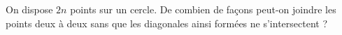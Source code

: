 On dispose $2n$ points sur un cercle. De combien de façons peut-on joindre les points deux à deux sans que les diagonales ainsi formées ne s'intersectent ?

